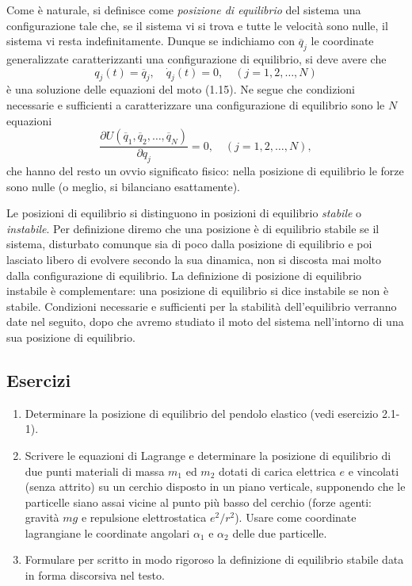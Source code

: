\documentclass[11pt, a4paper]{book}
\numberwithin{equation}{section}
\newenvironment{esercizi}{\subsection*{Esercizi}\begin{enumerate}}{\end{enumerate}}
\begin{document}
Come è naturale, si definisce come \textit{posizione di equilibrio} del sistema una configurazione tale che, se il sistema vi si trova e tutte le velocità sono nulle, il sistema vi resta indefinitamente. Dunque se indichiamo con $\overline{q}_j$ le coordinate generalizzate caratterizzanti una configurazione di equilibrio, si deve avere che
\begin{equation}
q_j(t) = \overline{q}_j, \quad \dot{q}_j(t) = 0, \quad (j = 1, 2, \dots, N)
\end{equation}
è una soluzione delle equazioni del moto (1.15). Ne segue che condizioni necessarie e sufficienti a caratterizzare una configurazione di equilibrio sono le $N$ equazioni
\begin{equation}
\frac{\partial U(\overline{q}_1, \overline{q}_2, \dots, \overline{q}_N)}{\partial q_j} = 0, \quad (j = 1, 2, \dots, N),
\end{equation}
che hanno del resto un ovvio significato fisico: nella posizione di equilibrio le forze sono nulle (o meglio, si bilanciano esattamente).

Le posizioni di equilibrio si distinguono in posizioni di equilibrio \textit{stabile} o \textit{instabile}. Per definizione diremo che una posizione è di equilibrio stabile se il sistema, disturbato comunque sia di poco dalla posizione di equilibrio e poi lasciato libero di evolvere secondo la sua dinamica, non si discosta mai molto dalla configurazione di equilibrio. La definizione di posizione di equilibrio instabile è complementare: una posizione di equilibrio si dice instabile se non è stabile. Condizioni necessarie e sufficienti per la stabilità dell'equilibrio verranno date nel seguito, dopo che avremo studiato il moto del sistema nell'intorno di una sua posizione di equilibrio.

\begin{esercizi}
\item Determinare la posizione di equilibrio del pendolo elastico (vedi esercizio 2.1-1).
\item Scrivere le equazioni di Lagrange e determinare la posizione di equilibrio di due punti materiali di massa $m_1$ ed $m_2$ dotati di carica elettrica $e$ e vincolati (senza attrito) su un cerchio disposto in un piano verticale, supponendo che le particelle siano assai vicine al punto più basso del cerchio (forze agenti: gravità $m g$ e repulsione elettrostatica $e^2/r^2$). Usare come coordinate lagrangiane le coordinate angolari $\alpha_1$ e $\alpha_2$ delle due particelle. %
\item Formulare per scritto in modo rigoroso la definizione di equilibrio stabile data in forma discorsiva nel testo.
\end{esercizi}
\end{document}
